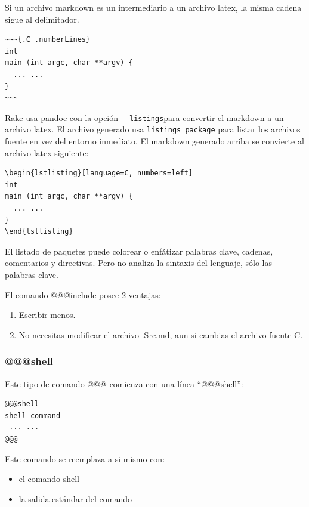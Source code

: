 Si un archivo markdown es un intermediario a un archivo latex, la misma
cadena sigue al delimitador.

\begin{verbatim}
~~~{.C .numberLines}
int
main (int argc, char **argv) {
  ... ...
}
~~~
\end{verbatim}

Rake usa pandoc con la opción \texttt{-\/-listings}para convertir el
markdown a un archivo latex. El archivo generado usa
\texttt{listings\ package} para listar los archivos fuente en vez del
entorno inmediato. El markdown generado arriba se convierte al archivo
latex siguiente:

\begin{verbatim}
\begin{lstlisting}[language=C, numbers=left]
int
main (int argc, char **argv) {
  ... ...
}
\end{lstlisting}
\end{verbatim}

El listado de paquetes puede colorear o enfátizar palabras clave,
cadenas, comentarios y directivas. Pero no analiza la sintaxis del
lenguaje, sólo las palabras clave.

El comando @@@include posee 2 ventajas:

\begin{enumerate}
\def\labelenumi{\arabic{enumi}.}
\tightlist
\item
  Escribir menos.
\item
  No necesitas modificar el archivo .Src.md, aun si cambias el archivo
  fuente C.
\end{enumerate}

\hypertarget{shell}{%
\subsubsection{@@@shell}\label{shell}}

Este tipo de comando @@@ comienza con una línea ``@@@shell'':

\begin{verbatim}
@@@shell
shell command
 ... ...
@@@
\end{verbatim}

Este comando se reemplaza a si mismo con:

\begin{itemize}
\tightlist
\item
  el comando shell
\item
  la salida estándar del comando
\end{itemize}

